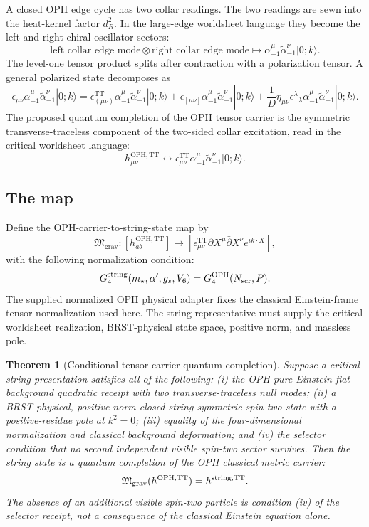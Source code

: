 \documentclass[11pt]{article}
\newtheorem{theorem}{Theorem}[section]
\theoremstyle{remark}
\theoremstyle{plain}
\newcommand{\OPH}{\mathrm{OPH}}
\newcommand{\Mgrav}{\mathfrak M_{\mathrm{grav}}}
\newcommand{\TT}{\mathrm{TT}}
\begin{document}
A closed OPH edge cycle has two collar readings. The two readings are sewn into the heat-kernel
factor \(d_R^2\). In the large-edge worldsheet language they become the left and right chiral
oscillator sectors:
\[
\text{left collar edge mode}\otimes\text{right collar edge mode}
\longmapsto
\alpha_{-1}^{\mu}\tilde\alpha_{-1}^{\nu}|0;k\rangle .
\]
The level-one tensor product splits after contraction with a polarization tensor. A general
polarized state decomposes as
\[
\epsilon_{\mu\nu}\alpha_{-1}^{\mu}\tilde\alpha_{-1}^{\nu}|0;k\rangle
=
\epsilon^{\TT}_{(\mu\nu)}\alpha_{-1}^{\mu}\tilde\alpha_{-1}^{\nu}|0;k\rangle
+
\epsilon_{[\mu\nu]}\alpha_{-1}^{\mu}\tilde\alpha_{-1}^{\nu}|0;k\rangle
+
\frac1D\eta_{\mu\nu}\epsilon^\lambda{}_{\lambda}
\alpha_{-1}^{\mu}\tilde\alpha_{-1}^{\nu}|0;k\rangle .
\]
The proposed quantum completion of the OPH tensor carrier is the symmetric
transverse-traceless component of the two-sided collar excitation, read in the critical worldsheet
language:
\[
h_{\mu\nu}^{\OPH,\TT}
\longleftrightarrow
\epsilon_{\mu\nu}^{\TT}\alpha_{-1}^{\mu}\tilde\alpha_{-1}^{\nu}|0;k\rangle .
\]

\subsection{The map}

Define the OPH-carrier-to-string-state map by
\[
\Mgrav:
[h_{ab}^{\OPH,\TT}]
\longmapsto
[\epsilon^{\TT}_{\mu\nu}\partial X^\mu\bar\partial X^\nu e^{ik\cdot X}],
\]
with the following normalization condition:
\[
G_4^{\rm string}(m_\star,\alpha',g_s,V_6)
=
G_4^{\OPH}(N_{\rm scr},P).
\]
The supplied normalized OPH physical adapter fixes the classical Einstein-frame
tensor normalization used here. The string representative must supply
the critical worldsheet realization, BRST-physical state space, positive norm, and massless pole.

\begin{theorem}[Conditional tensor-carrier quantum completion]
Suppose a critical-string presentation satisfies all of the following: (i) the OPH pure-Einstein
flat-background quadratic receipt with two transverse-traceless null modes; (ii) a BRST-physical,
positive-norm closed-string symmetric spin-two state with a positive-residue pole at \(k^2=0\);
(iii) equality of the four-dimensional normalization and classical background deformation; and
(iv) the selector condition that no second independent visible spin-two sector survives. Then the
string state is a quantum completion of the OPH classical metric carrier:
\[
\Mgrav(h^{\OPH,\TT})=h^{\rm string,\TT}.
\]
The absence of an additional visible spin-two particle is condition (iv) of the selector receipt,
not a consequence of the classical Einstein equation alone.
\end{theorem}
\end{document}
